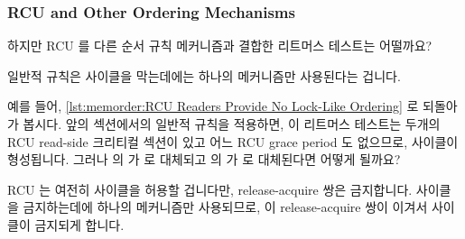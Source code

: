 \fi

\subsubsection{RCU and Other Ordering Mechanisms}
\label{sec:memorder:RCU and Other Ordering Mechanisms}

하지만 RCU 를 다른 순서 규칙 메커니즘과 결합한 리트머스 테스트는 어떨까요?

일반적 규칙은 사이클을 막는데에는 하나의 메커니즘만 사용된다는 겁니다.

예를 들어,
\cref{lst:memorder:RCU Readers Provide No Lock-Like Ordering} 로 되돌아 가
봅시다.
앞의 섹션에서의 일반적 규칙을 적용하면, 이 리트머스 테스트는 두개의 RCU
read-side 크리티컬 섹션이 있고 어느 RCU grace period 도 없으므로, 사이클이
형성됩니다.
그러나  의  가  로 대체되고
 의  가  로 대체된다면 어떻게
될까요?

RCU 는 여전히 사이클을 허용할 겁니다만, release-acquire 쌍은 금지합니다.
사이클을 금지하는데에 하나의 메커니즘만 사용되므로, 이 release-acquire 쌍이
이겨서 사이클이 금지되게 합니다.

